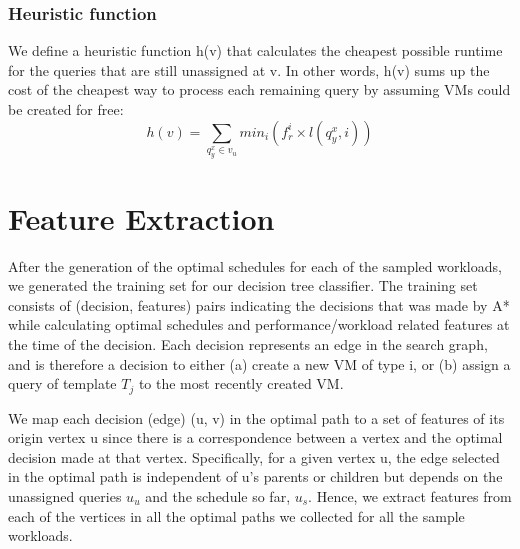 \subsubsection{Heuristic function}
We define a heuristic function h(v) \cite{hart1968formal} that calculates the cheapest possible runtime for the queries that are still unassigned at v. In other words, h(v) sums up the cost of the cheapest way to process each remaining query by assuming VMs could be created for free:\\
\begin{equation} \label{heuristic}
h(v) = \sum _{q^x_y \in v_u} min_i (f^i_r \times l(q^x_y , i))
\end{equation}
\section{Feature Extraction}
After the generation of the optimal schedules for each of the sampled workloads, we generated the training set for our decision tree classifier. The training set consists of (decision, features) pairs indicating the decisions that was made by A* while calculating optimal schedules and performance/workload related features at the time of the decision. Each decision represents an edge in the search graph, and is therefore a decision to either
(a) create a new VM of type i, or
(b) assign a query of template \(T_j\) to the most recently created VM. 

We map each decision (edge) (u, v) in the optimal path to a set of features of its origin vertex u since there is a correspondence between a vertex and the optimal decision made at that vertex. Specifically, for a given vertex u, the edge selected in the optimal path is independent of u’s parents or children but depends on the unassigned queries \(u_u\) and the schedule so far, \(u_s\). Hence, we extract features from each of the vertices in all the optimal paths we collected for all the sample workloads.
